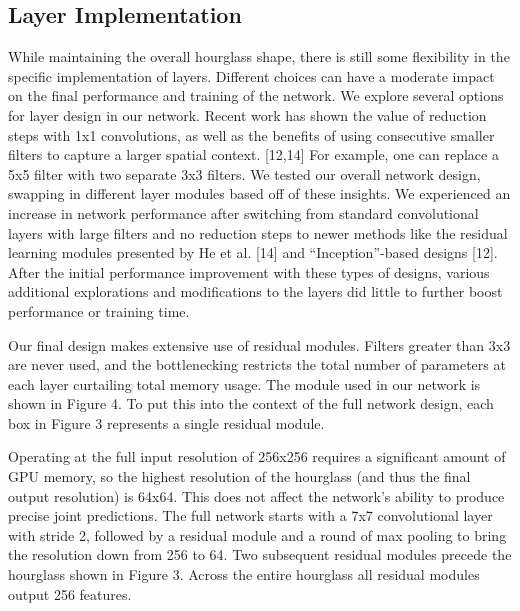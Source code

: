 \subsection{Layer Implementation}

While maintaining the overall hourglass shape, there is still some flexibility in the specific implementation of layers. Different choices can have a moderate impact on the final performance and training of the network. We explore several options for layer design in our network. Recent work has shown the value of reduction steps with 1x1 convolutions, as well as the benefits of using consecutive smaller filters to capture a larger spatial context. [12,14] For example, one can replace a 5x5 filter with two separate 3x3 filters. We tested our overall network design, swapping in different layer modules based off of these insights. We experienced an increase in network performance after switching from standard convolutional layers with large filters and no reduction steps to newer methods like the residual learning modules presented by He et al. [14] and “Inception”-based designs [12]. After the initial performance improvement with these types of designs, various additional explorations and modifications to the layers did little to further boost performance or training time.

Our final design makes extensive use of residual modules. Filters greater than 3x3 are never used, and the bottlenecking restricts the total number of parameters at each layer curtailing total memory usage. The module used in our network is shown in Figure 4. To put this into the context of the full network design, each box in Figure 3 represents a single residual module.

Operating at the full input resolution of 256x256 requires a significant amount of GPU memory, so the highest resolution of the hourglass (and thus the final output resolution) is 64x64. This does not affect the network’s ability to produce precise joint predictions. The full network starts with a 7x7 convolutional layer with stride 2, followed by a residual module and a round of max pooling to bring the resolution down from 256 to 64. Two subsequent residual modules precede the hourglass shown in Figure 3. Across the entire hourglass all residual modules output 256 features.

